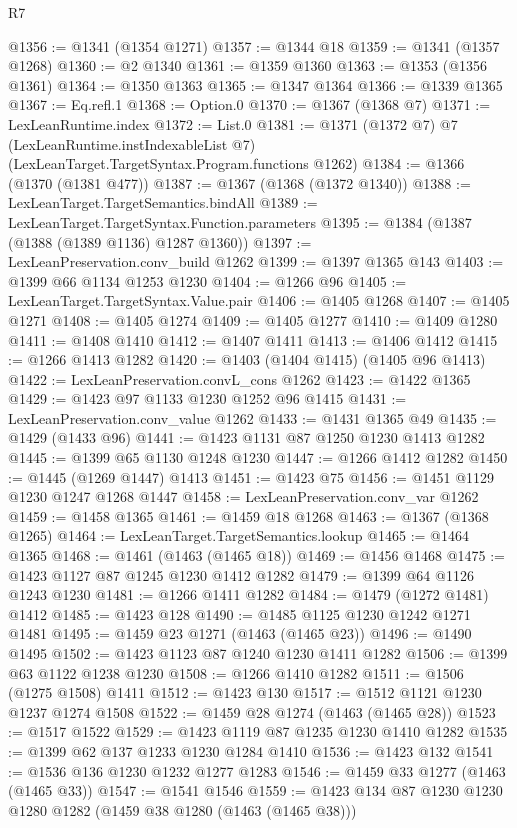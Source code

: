 \begin{lexlean}{R7}
\begin{coremodule}
@1356 := @1341 (@1354 @1271)
@1357 := @1344 @18
@1359 := @1341 (@1357 @1268)
@1360 := @2 @1340
@1361 := @1359 @1360
@1363 := @1353 (@1356 @1361)
@1364 := @1350 @1363
@1365 := @1347 @1364
@1366 := @1339 @1365
@1367 := Eq.refl.{1}
@1368 := Option.{0}
@1370 := @1367 (@1368 @7)
@1371 := LexLeanRuntime.index
@1372 := List.{0}
@1381 := @1371
    (@1372 @7)
    @7
    (LexLeanRuntime.instIndexableList @7)
    (LexLeanTarget.TargetSyntax.Program.functions @1262)
@1384 := @1366 (@1370 (@1381 @477))
@1387 := @1367 (@1368 (@1372 @1340))
@1388 := LexLeanTarget.TargetSemantics.bindAll
@1389 := LexLeanTarget.TargetSyntax.Function.parameters
@1395 := @1384 (@1387 (@1388 (@1389 @1136) @1287 @1360))
@1397 := LexLeanPreservation.conv_build @1262
@1399 := @1397 @1365 @143
@1403 := @1399 @66 @1134 @1253 @1230
@1404 := @1266 @96
@1405 := LexLeanTarget.TargetSyntax.Value.pair
@1406 := @1405 @1268
@1407 := @1405 @1271
@1408 := @1405 @1274
@1409 := @1405 @1277
@1410 := @1409 @1280
@1411 := @1408 @1410
@1412 := @1407 @1411
@1413 := @1406 @1412
@1415 := @1266 @1413 @1282
@1420 := @1403 (@1404 @1415) (@1405 @96 @1413)
@1422 := LexLeanPreservation.convL_cons @1262
@1423 := @1422 @1365
@1429 := @1423 @97 @1133 @1230 @1252 @96 @1415
@1431 := LexLeanPreservation.conv_value @1262
@1433 := @1431 @1365 @49
@1435 := @1429 (@1433 @96)
@1441 := @1423 @1131 @87 @1250 @1230 @1413 @1282
@1445 := @1399 @65 @1130 @1248 @1230
@1447 := @1266 @1412 @1282
@1450 := @1445 (@1269 @1447) @1413
@1451 := @1423 @75
@1456 := @1451 @1129 @1230 @1247 @1268 @1447
@1458 := LexLeanPreservation.conv_var @1262
@1459 := @1458 @1365
@1461 := @1459 @18 @1268
@1463 := @1367 (@1368 @1265)
@1464 := LexLeanTarget.TargetSemantics.lookup
@1465 := @1464 @1365
@1468 := @1461 (@1463 (@1465 @18))
@1469 := @1456 @1468
@1475 := @1423 @1127 @87 @1245 @1230 @1412 @1282
@1479 := @1399 @64 @1126 @1243 @1230
@1481 := @1266 @1411 @1282
@1484 := @1479 (@1272 @1481) @1412
@1485 := @1423 @128
@1490 := @1485 @1125 @1230 @1242 @1271 @1481
@1495 := @1459 @23 @1271 (@1463 (@1465 @23))
@1496 := @1490 @1495
@1502 := @1423 @1123 @87 @1240 @1230 @1411 @1282
@1506 := @1399 @63 @1122 @1238 @1230
@1508 := @1266 @1410 @1282
@1511 := @1506 (@1275 @1508) @1411
@1512 := @1423 @130
@1517 := @1512 @1121 @1230 @1237 @1274 @1508
@1522 := @1459 @28 @1274 (@1463 (@1465 @28))
@1523 := @1517 @1522
@1529 := @1423 @1119 @87 @1235 @1230 @1410 @1282
@1535 := @1399 @62 @137 @1233 @1230 @1284 @1410
@1536 := @1423 @132
@1541 := @1536 @136 @1230 @1232 @1277 @1283
@1546 := @1459 @33 @1277 (@1463 (@1465 @33))
@1547 := @1541 @1546
@1559 := @1423 @134 @87 @1230 @1230 @1280 @1282 (@1459 @38 @1280 (@1463 (@1465 @38)))

\end{coremodule}
\end{lexlean}
